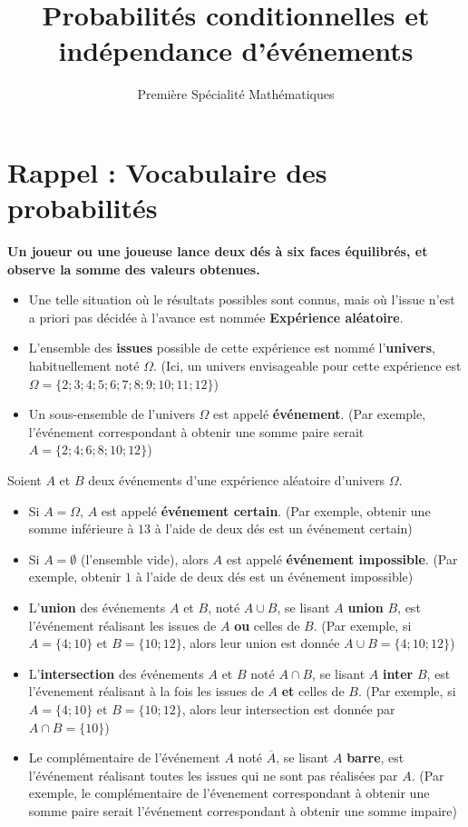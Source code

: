 \documentclass{poly}
\title{Probabilités conditionnelles et indépendance d'événements}
\date{}
\author{Première Spécialité Mathématiques}
\begin{document}
\maketitle

\section{Rappel : Vocabulaire des probabilités}
\textbf{Un joueur ou une joueuse lance deux dés à six faces équilibrés, et observe la somme des valeurs obtenues.}
\begin{definition}
\hfill
\begin{itemize}
\item Une telle situation où le résultats possibles sont connus, mais où l'issue n'est a priori pas décidée à l'avance est nommée \textbf{Expérience aléatoire}.
\item L'ensemble des \textbf{issues} possible de cette expérience est nommé l'\textbf{univers}, habituellement noté $\Omega$. (Ici, un univers envisageable pour cette expérience est $\Omega = \{2;3;4;5;6;7;8;9;10;11;12\}$)
\item Un sous-ensemble de l'univers $\Omega$ est appelé \textbf{événement}. (Par exemple, l'événement correspondant à obtenir une somme paire serait $A = \{2;4;6;8;10;12\}$)
\end{itemize}
\end{definition}
\begin{definition}
Soient $A$ et $B$ deux événements d'une expérience aléatoire d'univers $\Omega$.
\begin{itemize}
\item Si $A = \Omega$, $A$ est appelé \textbf{événement certain}. (Par exemple, obtenir une somme inférieure à $13$ à l'aide de deux dés est un événement certain)
\item Si $A = \emptyset$ (l'ensemble vide), alors $A$ est appelé \textbf{événement impossible}. (Par exemple, obtenir $1$ à l'aide de deux dés est un événement impossible)
\item L'\textbf{union} des événements $A$ et $B$, noté $A \cup B$, se lisant \og $A$ \textbf{union} $B$\fg, est l'événement réalisant les issues de $A$ \textbf{ou} celles de $B$. (Par exemple, si $A = \{4;10\}$ et $B = \{10;12\}$, alors leur union est donnée $A \cup B = \{4;10;12\}$)
\item L'\textbf{intersection} des événements $A$ et $B$ noté $A \cap B$, se lisant \og $A$ \textbf{inter} $B$, est l'évenement réalisant à la fois les issues de $A$ \textbf{et} celles de $B$. (Par exemple, si $A = \{4;10\}$ et $B = \{10;12\}$, alors leur intersection est donnée par $A \cap B = \{10\}$)
\item Le complémentaire de l'événement $A$ noté $\overbar{A}$, se lisant \og $A$ \textbf{barre}\fg, est l'événement réalisant toutes les issues qui ne sont pas réalisées par $A$. (Par exemple, le complémentaire de l'évenement correspondant à obtenir une somme paire serait l'événement correspondant à obtenir une somme impaire)
\end{itemize}
\end{definition}
\end{document}
